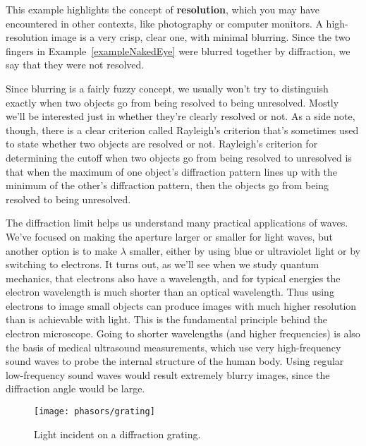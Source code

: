 This example highlights the  concept of \textbf{resolution}, which you
may have  encountered in other contexts, like  photography or computer
monitors. A  high-resolution image  is a very  crisp, clear  one, with
minimal      blurring.      Since      the     two      fingers     in
Example~\ref{exampleNakedEye} were blurred together by diffraction, we
say that they were not resolved. 

Since  blurring is a  fairly fuzzy  concept, we  usually won't  try to
distinguish exactly when  two objects go from being  resolved to being
unresolved. Mostly we'll be interested just in whether they're clearly
resolved or not.   As a side note, though, there  is a clear criterion
called Rayleigh's criterion that's sometimes used to state whether two
objects are resolved or not.  Rayleigh's criterion for determining the
cutoff when two  objects go from being resolved  to unresolved is that
when the maximum of one object's diffraction pattern lines up with the
minimum of the  other's diffraction pattern, then the  objects go from
being resolved to being unresolved.

The diffraction limit helps  us understand many practical applications
of waves.  We've focused on  making the aperture larger or smaller for
light waves, but  another option is to make  $\lambda$ smaller, either
by using  blue or ultraviolet light  or by switching  to electrons. It
turns  out,  as  we'll  see  when we  study  quantum  mechanics,  that
electrons  also  have  a  wavelength,  and for  typical  energies  the
electron wavelength is much  shorter than an optical wavelength.  Thus
using electrons  to image small  objects can produce images  with much
higher resolution than is achievable  with light. This is the fundamental
principle behind
the  electron microscope.   Going to  shorter wavelengths  (and higher
frequencies)  is also  the basis  of medical  ultrasound measurements,
which  use  very high-frequency  sound  waves  to  probe the  internal
structure of  the human body. Using regular  low-frequency sound waves
would  result extremely  blurry  images, since  the diffraction  angle
would be large.





\begin{figure}
\begin{center}
\texttt{[image: phasors/grating]}
\end{center}
\caption{\label{fig:grating}Light incident on a diffraction grating.}
\end{figure}



